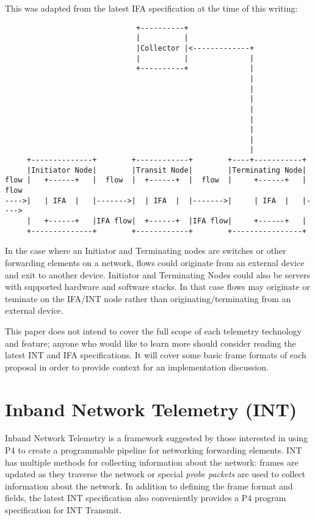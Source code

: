 \documentclass[letterpaper,twocolumn,10pt]{article}
\begin{document}
This was adapted from the latest IFA specification at the time of this
writing:
\tiny
\begin{center}
\begin{verbatim}
                              +----------+
                              |          |
                              |Collector |<-------------+
                              |          |              |
                              +----------+              |
                                                        |
                                                        |
                                                        |
                                                        |
                                                        |
                                                        |
                                                        | 
                                                        |
     +--------------+        +------------+        +----+-----------+
     |Initiator Node|        |Transit Node|        |Terminating Node|
flow |   +------+   |  flow  |  +------+  |  flow  |     +------+   | flow
---->|   | IFA  |   |------->|  | IFA  |  |------->|     | IFA  |   |---->
     |   +------+   |IFA flow|  +------+  |IFA flow|     +------+   |
     +--------------+        +------------+        +----------------+
\end{verbatim}
\end{center}
\normalsize

In the case where an Initiator and Terminating nodes are switches or
other forwarding elements on a network, flows could originate from an
external device and exit to another device.  Initiator and Terminating
Nodes could also be servers with supported hardware and software stacks.
In that case flows may originate or teminate on the IFA/INT node rather
than originating/terminating from an external device.

This paper does not intend to cover the full scope of each telemetry
technology and feature; anyone who would like to learn more should
consider reading the latest INT and IFA specifications.  It will cover
some basic frame formats of each proposal in order to provide context
for an implementation discussion.

\section{Inband Network Telemetry (INT)}

Inband Network Telemetry is a framework suggested by
those interested in using P4 to create a programmable pipeline for
networking forwarding elements.  INT has multiple methods for collecting
information about the network: frames are updated as they traverse the
network or special \textit{probe packets} are used to collect
information about the network.  In addition to defining the frame format
and fields, the latest INT specification also conveniently provides a P4
program specification for INT Transmit.
\end{document}
